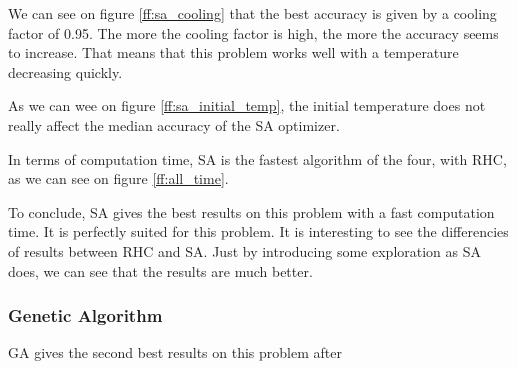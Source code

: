 \documentclass[twocolumn, 10pt]{article}
\begin{document}
				We can see on figure \ref{ff:sa_cooling} that the best accuracy is given by a cooling factor of 0.95. The more the cooling factor is high, the more the accuracy seems to increase. That means that this problem works well with a temperature decreasing quickly.

				As we can wee on figure \ref{ff:sa_initial_temp}, the initial temperature does not really affect the median accuracy of the SA optimizer.

				In terms of computation time, SA is the fastest algorithm of the four, with RHC, as we can see on figure \ref{ff:all_time}.

				To conclude, SA gives the best results on this problem with a fast computation time. It is perfectly suited for this problem. It is interesting to see the differencies of results between RHC and SA. Just by introducing some exploration as SA does, we can see that the results are much better.
			\subsubsection*{Genetic Algorithm}
				GA gives the second best results on this problem after
\end{document}
